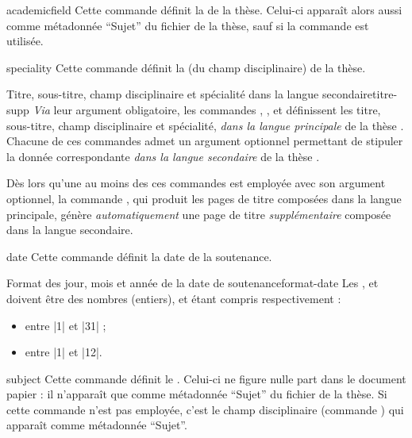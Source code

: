 %
\begin{docCommand}[doc description=\mandatory]{academicfield}{}
  Cette commande définit la  
  de la thèse. Celui-ci apparaît alors aussi comme métadonnée \enquote{Sujet} du
  fichier \pdf de la thèse, sauf si la commande  est utilisée.
\end{docCommand}
%
\begin{docCommand}{speciality}{}
  Cette commande définit la  (du champ
  disciplinaire) de la thèse.
\end{docCommand}
%
\begin{dbremark}{Titre, sous-titre, champ disciplinaire et spécialité dans la
    langue secondaire}{titre-supp}
  \emph{Via} leur argument obligatoire, les commandes ,
  ,  et  définissent
  les titre, sous-titre, champ disciplinaire et spécialité, \emph{dans la
    langue principale} de la thèse . Chacune de
  ces commandes admet un argument optionnel permettant de stipuler la donnée
  correspondante \emph{dans la langue secondaire} de la thèse .

  Dès lors qu'une au moins des ces commandes est employée avec son argument
  optionnel, la commande , qui produit les pages de titre
  composées dans la langue principale, génère \emph{automatiquement} une page
  de titre \emph{supplémentaire} composée dans la langue secondaire.
\end{dbremark}
%
\begin{docCommand}[doc description=\mandatory]{date}{}
  Cette commande définit la date de la soutenance.
  \begin{dbwarning}{Format des jour, mois et année de la date de
      soutenance}{format-date}
    Les ,  et  doivent être des nombres
    (entiers),  et  étant compris respectivement :
    \begin{itemize}
    \item entre |1| et |31| ;
    \item entre |1| et |12|.
    \end{itemize}
  \end{dbwarning}
\end{docCommand}
%
\begin{docCommand}{subject}{}
  Cette commande définit le .  Celui-ci ne figure nulle
  part dans le document papier : il n'apparaît que comme métadonnée
  \enquote{Sujet} du fichier \pdf de la thèse. Si cette commande n'est pas
  employée, c'est le champ disciplinaire (commande ) qui
  apparaît comme métadonnée \enquote{Sujet}.
\end{docCommand}

